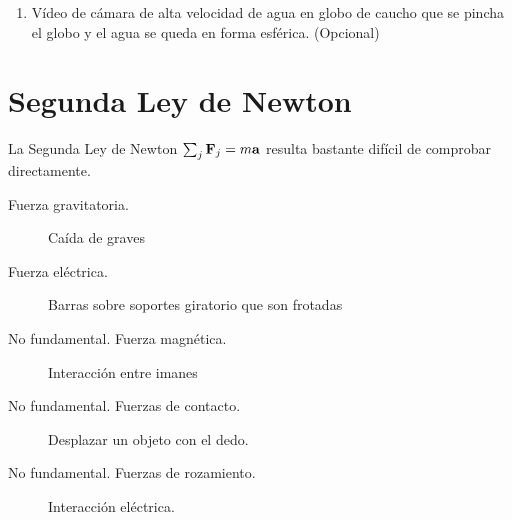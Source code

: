 \documentclass[11pt]{articulo}
\begin{document}
\begin{enumerate}
\item V\'ideo de c\'amara de alta velocidad de agua en globo de caucho que se pincha el globo y el agua se queda en forma esf\'erica. (Opcional)
\end{enumerate}
 
\section{Segunda Ley de Newton}

La Segunda Ley de Newton $\sum_j {\bf F}_j = m {\bf a}$ resulta bastante dif\'icil de comprobar directamente. 

\begin{description}
\item[Fuerza gravitatoria.] Ca\'ida de graves
\item[Fuerza el\'ectrica.] Barras sobre soportes giratorio que son frotadas
\item[No fundamental. Fuerza magn\'etica.] Interacci\'on entre imanes
\item[No fundamental. Fuerzas de contacto.] Desplazar un objeto con el dedo. 
\item[No fundamental. Fuerzas de rozamiento.] Interacci\'on el\'ectrica.
\end{description}
\end{document}

